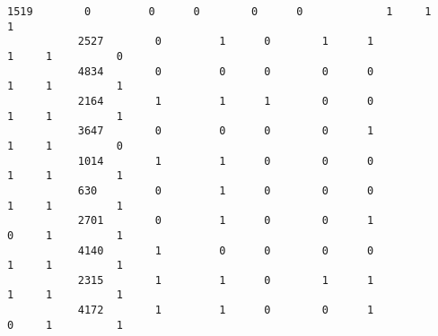 \documentclass[11pt]{article}
\begin{document}
\begin{Verbatim}[commandchars=\\\{\}]
           1519        0         0      0        0      0             1     1          1   
           2527        0         1      0        1      1             1     1          0   
           4834        0         0      0        0      0             1     1          1   
           2164        1         1      1        0      0             1     1          1   
           3647        0         0      0        0      1             1     1          0   
           1014        1         1      0        0      0             1     1          1   
           630         0         1      0        0      0             1     1          1   
           2701        0         1      0        0      1             0     1          1   
           4140        1         0      0        0      0             1     1          1   
           2315        1         1      0        1      1             1     1          1   
           4172        1         1      0        0      1             0     1          1   
           

\end{Verbatim}
\end{document}
